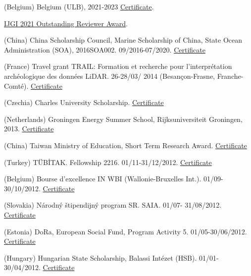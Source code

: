 \documentclass[10pt]{article}
\begin{document}
\begin{etaremune}[topsep=0pt,itemsep=0pt,partopsep=0pt,parsep=0pt]
	
	\item (Belgium) Belgium (ULB), 2021-2023 \href{https://drive.google.com/file/d/12GV1lxOE5hzKW_jA8hX1gHQv34-ZZug1/view?usp=share_link}{Certificate}.
	\item \href{https://www.mdpi.com/journal/ijgi/awards/1467}{IJGI 2021 Outstanding Reviewer Award}.
	\item	(China) China Scholarship Council, Marine Scholarship of China, State Ocean Administration (SOA), 2016SOA002. 09/2016-07/2020. \href{https://drive.google.com/file/d/1WyY5z_lgya8opitqz4zgSyKJZ_nh38_F/view?usp=share_link}{Certificate}
	\item (France) Travel grant TRAIL: Formation et recherche pour l'interpr\'etation arch\'eologique des donn\'ees LiDAR. 26-28/03/ 2014 (Besançon-Frasne, Franche-Comté). \href{https://drive.google.com/file/d/1G0eseeApuGnQrhYwaorufKgnP6GF5dU6/view?usp=share_link}{Certificate}
	\item (Czechia) Charles University Scholarship. \href{https://drive.google.com/file/d/1d4fBGsS8xWEkQJbhtv6joinQmZhtAQCK/view?usp=share_link}{Certificate}
	\item (Netherlands) Groningen Energy Summer School, Rijksuniversiteit Groningen, 2013. \href{https://drive.google.com/file/d/1zzzhGZahmzWdenGO50Aw5YSCSQq6EcO4/view?usp=share_link}{Certificate}
	\item (China) Taiwan Ministry of Education, Short Term Research Award. \href{https://drive.google.com/file/d/1tGNpr77nxDyCOxHYZekWINqIzaHwCsc2/view?usp=share_link}{Certificate}
	\item (Turkey) T\"{U}B\.{I}TAK. Fellowship 2216. 01/11-31/12/2012. \href{https://drive.google.com/file/d/1RJtvMIjDN17G7cBT_7g6hl8zQ8Lk8Hjk/view?usp=share_link}{Certificate}
	\item (Belgium) Bourse d'excellence IN WBI (Wallonie-Bruxelles Int.). 01/09-30/10/2012. \href{https://drive.google.com/file/d/1tiOaWNK9iZshkHppaQAyFUrhurOhSz-l/view?usp=share_link}{Certificate}
	\item (Slovakia) N\'{a}rodn\'{y} \v{s}tipendijn\'{y} program SR. SAIA. 01/07- 31/08/2012. \href{https://drive.google.com/file/d/1xs_i-NIp55hCifoOWBCBU-GGmlW_5avI/view?usp=share_link}{Certificate}
	\item (Estonia) DoRa, European Social Fund, Program Activity 5. 01/05-30/06/2012. \href{https://drive.google.com/file/d/15JWLTKIX5-XakOkbhUXfdNo9FNR8pRjU/view?usp=share_link}{Certificate}
	\item (Hungary) Hungarian State Scholarship, Balassi Int\'{e}zet (HSB). 01/01-30/04/2012. \href{https://drive.google.com/file/d/1S3B-s4Gv_UB7ucJe8JGS-JhpijxQBJ6W/view?usp=share_link}{Certificate}

\end{etaremune}
\end{document}

